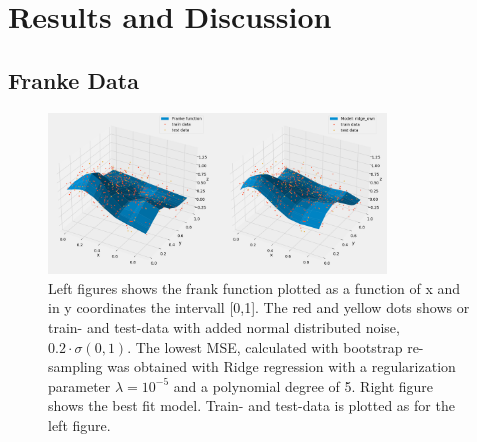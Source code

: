 \section{Results and Discussion}

\subsection{Franke Data}
\begin{figure}[H]
    \centering \includegraphics[width=0.8\textwidth]{Figures/franke_data_and_model_ridge_best.png}
    \caption{Left figures shows the frank function plotted as a function of x
    and in y coordinates the intervall [0,1]. The red and yellow dots shows or
train- and test-data with added normal distributed noise, $0.2 \cdot
\sigma(0,1)$. The lowest MSE, calculated with bootstrap re-sampling was obtained
with Ridge regression with a regularization parameter $\lambda = 10^{-5}$ and a
polynomial degree of 5. Right figure shows the best fit model. Train- and
test-data is plotted as for the left figure.} 
\end{figure}


